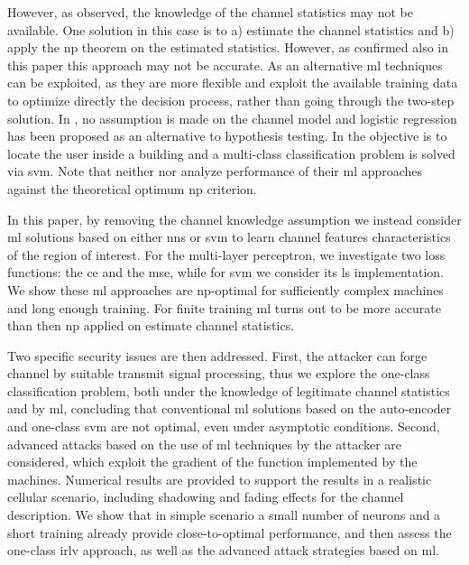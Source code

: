 \documentclass[draftcls,onecolumn,12pt]{IEEEtran}
\begin{document}
However, as observed, the knowledge of the channel statistics may not be available. One solution in this case is to a) estimate the channel statistics and b) apply the \ac{np} theorem on the estimated statistics. However, as confirmed also in this paper this approach may not be accurate. As an alternative \ac{ml} techniques  can be exploited, as they are more flexible and exploit the available training data to optimize directly the decision process, rather than going through the two-step solution. In  \cite{xiao-2018}, no assumption is made on the channel model and logistic regression has been proposed as an alternative to hypothesis testing. In \cite{tian2015robust} the objective is to locate the user inside a building and a multi-class classification problem is solved via \ac{svm}. Note that neither  \cite{xiao-2018}  nor \cite{tian2015robust} analyze performance of their \ac{ml} approaches against the theoretical optimum \ac{np} criterion.

In this paper, by removing the channel knowledge assumption we instead consider \ac{ml} solutions based on either \acp{nn} or \ac{svm} to learn channel features characteristics of the region of interest. For the multi-layer perceptron, we investigate two loss functions: the \ac{ce} and the \ac{mse}, while for \ac{svm} we consider its \ac{ls} implementation.  We show these \ac{ml} approaches are \ac{np}-optimal for sufficiently complex machines and long enough training. For finite training \ac{ml} turns out to be more accurate than then \ac{np} applied on estimate channel statistics. 

Two specific security issues are then addressed. First, the attacker can forge channel by suitable transmit signal processing, thus we explore the one-class classification problem, both under the knowledge of legitimate channel statistics and by \ac{ml}, concluding that conventional \ac{ml} solutions based on the auto-encoder and one-class \ac{svm} are not optimal, even under asymptotic conditions. Second, advanced attacks based on the use of \ac{ml} techniques by the attacker are considered, which exploit the gradient of the function implemented by the machines. Numerical results are provided to support the results in a realistic cellular scenario, including shadowing and fading effects for the channel description. We show that in simple scenario a small number of neurons and a short training already provide close-to-optimal performance, and then assess the one-class \ac{irlv} approach, as well as the advanced attack strategies based on \ac{ml}.
\end{document}
